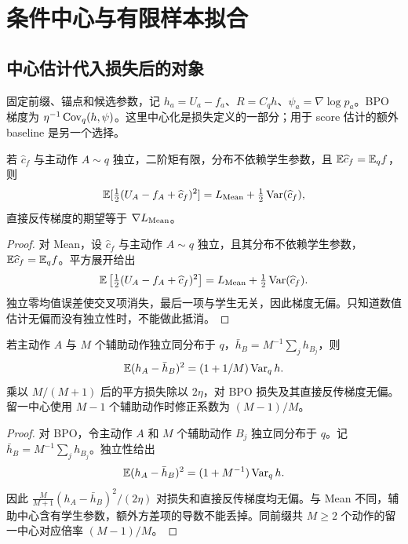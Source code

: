 \chapter{条件中心与有限样本拟合}
\label{app:centers}
\section{中心估计代入损失后的对象}
固定前缀、锚点和候选参数，记 $h_a=U_a-f_a$、$R=C_qh$、$\psi_a=\nabla\log p_a$。BPO 梯度为 $\eta^{-1}\operatorname{Cov}_q(h,\psi)$。这里中心化是损失定义的一部分；用于 score 估计的额外 baseline 是另一个选择。

\begin{proposition}
若 $\widehat c_f$ 与主动作 $A\sim q$ 独立，二阶矩有限，分布不依赖学生参数，且 $\mathbb E\widehat c_f=\mathbb E_qf$，则
\begin{equation}
\mathbb E[\tfrac12(U_A-f_A+\widehat c_f)^2]=L_{\rm Mean}+\tfrac12\operatorname{Var}(\widehat c_f),
\end{equation}
直接反传梯度的期望等于 $\nabla L_{\rm Mean}$。
\end{proposition}
\begin{proof}
对 Mean，设 $\widehat c_f$ 与主动作 $A\sim q$ 独立，且其分布不依赖学生参数，$\mathbb E\widehat c_f=\mathbb E_qf$。平方展开给出
\begin{equation}
\mathbb E\left[\tfrac12(U_A-f_A+\widehat c_f)^2\right]
=L_{\rm Mean}+\tfrac12\operatorname{Var}(\widehat c_f).
\end{equation}
独立零均值误差使交叉项消失，最后一项与学生无关，因此梯度无偏。只知道数值估计无偏而没有独立性时，不能做此抵消。
\end{proof}

\begin{proposition}
若主动作 $A$ 与 $M$ 个辅助动作独立同分布于 $q$，$\bar h_B=M^{-1}\sum_jh_{B_j}$，则
\begin{equation}
\mathbb E(h_A-\bar h_B)^2=(1+1/M)\operatorname{Var}_qh.
\end{equation}
乘以 $M/(M+1)$ 后的平方损失除以 $2\eta$，对 BPO 损失及其直接反传梯度无偏。留一中心使用 $M-1$ 个辅助动作时修正系数为 $(M-1)/M$。
\end{proposition}
\begin{proof}
对 BPO，令主动作 $A$ 和 $M$ 个辅助动作 $B_j$ 独立同分布于 $q$。记 $\bar h_B=M^{-1}\sum_jh_{B_j}$。独立性给出
\begin{equation}
\mathbb E(h_A-\bar h_B)^2=(1+M^{-1})\operatorname{Var}_qh.
\end{equation}
因此 $\frac{M}{M+1}(h_A-\bar h_B)^2/(2\eta)$ 对损失和直接反传梯度均无偏。与 Mean 不同，辅助中心含有学生参数，额外方差项的导数不能丢掉。同前缀共 $M\ge2$ 个动作的留一中心对应倍率 $(M-1)/M$。
\end{proof}


